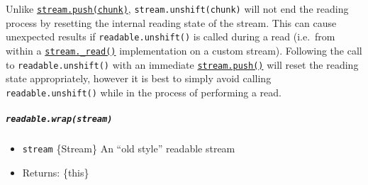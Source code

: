 \begin{Shaded}
\begin{Highlighting}[]
        \OperatorTok{=} \OperatorTok{,} \NormalTok{)}\OperatorTok{;}
\NormalTok{(}\OperatorTok{,}\OperatorTok{;}
\NormalTok{(}\OperatorTok{,}\OperatorTok{;}
        \NormalTok{)}
\OperatorTok{;}
        \NormalTok{(}\OperatorTok{,}\OperatorTok{,}\OperatorTok{;}
        \OperatorTok{;}
\NormalTok{      \}}
\OperatorTok{+=}\OperatorTok{;}
\NormalTok{    \}}
\NormalTok{  \}}
\NormalTok{\}}
\end{Highlighting}
\end{Shaded}

Unlike
\hyperref[readablepushchunk-encoding]{\texttt{stream.push(chunk)}},
\texttt{stream.unshift(chunk)} will not end the reading process by
resetting the internal reading state of the stream. This can cause
unexpected results if \texttt{readable.unshift()} is called during a
read (i.e.~from within a
\hyperref[readable_readsize]{\texttt{stream.\_read()}} implementation on
a custom stream). Following the call to \texttt{readable.unshift()} with
an immediate
\hyperref[readablepushchunk-encoding]{\texttt{stream.push(\textquotesingle{}\textquotesingle{})}}
will reset the reading state appropriately, however it is best to simply
avoid calling \texttt{readable.unshift()} while in the process of
performing a read.

\subparagraph{\texorpdfstring{\texttt{readable.wrap(stream)}}{readable.wrap(stream)}}\label{readable.wrapstream}

\begin{itemize}
\tightlist
\item
  \texttt{stream} \{Stream\} An ``old style'' readable stream
\item
  Returns: \{this\}
\end{itemize}

